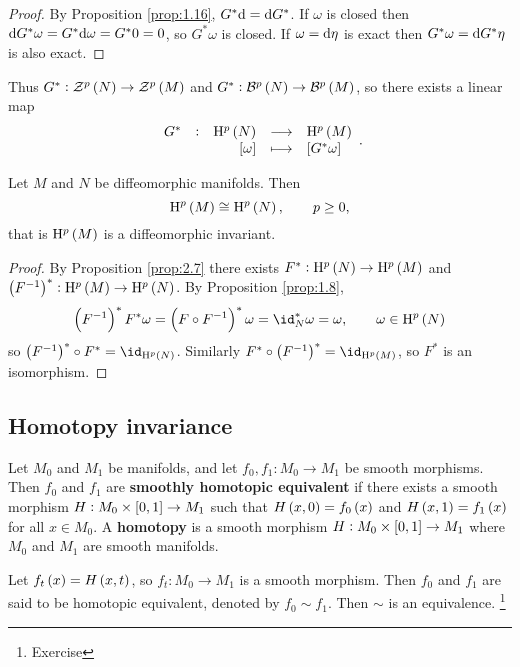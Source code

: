 \begin{proof}
By Proposition \ref{prop:1.16}, $ G^*\mathrm{d} = \mathrm{d} G^* $. If $ \omega $ is closed then $ \mathrm{d} G^*\omega = G^*\mathrm{d}\omega = G^*0 = 0 $, so $ G^*\omega $ is closed. If $ \omega = \mathrm{d}\eta $ is exact then $ G^*\omega = \mathrm{d} G^*\eta $ is also exact.
\end{proof}

Thus $ G^* : \ZZZ^p\br{N} \to \ZZZ^p\br{M} $ and $ G^* : \BBB^p\br{N} \to \BBB^p\br{M} $, so there exists a linear map
$$ \function[G^*]{\H^p\br{N}}{\H^p\br{M}}{\sbr{\omega}}{\sbr{G^*\omega}}. $$

\begin{corollary}
Let $ M $ and $ N $ be diffeomorphic manifolds. Then
$$ \H^p\br{M} \cong \H^p\br{N}, \qquad p \ge 0, $$
that is $ \H^p\br{M} $ is a diffeomorphic invariant.
\end{corollary}

\begin{proof}
By Proposition \ref{prop:2.7} there exists $ F^* : \H^p\br{N} \to \H^p\br{M} $ and $ \br{F^{-1}}^* : \H^p\br{M} \to \H^p\br{N} $. By Proposition \ref{prop:1.8},
$$ \br{F^{-1}}^*F^*\omega = \br{F \circ F^{-1}}^*\omega = \id_N^*\omega = \omega, \qquad \omega \in \H^p\br{N} $$
so $ \br{F^{-1}}^* \circ F^* = \id_{\H^p\br{N}} $. Similarly $ F^* \circ \br{F^{-1}}^* = \id_{\H^p\br{M}} $, so $ F^* $ is an isomorphism.
\end{proof}

\subsection{Homotopy invariance}

\begin{definition}
Let $ M_0 $ and $ M_1 $ be manifolds, and let $ f_0, f_1 : M_0 \to M_1 $ be smooth morphisms. Then $ f_0 $ and $ f_1 $ are \textbf{smoothly homotopic equivalent} if there exists a smooth morphism $ H : M_0 \times \sbr{0, 1} \to M_1 $ such that $ H\br{x, 0} = f_0\br{x} $ and $ H\br{x, 1} = f_1\br{x} $ for all $ x \in M_0 $. A \textbf{homotopy} is a smooth morphism $ H : M_0 \times \sbr{0, 1} \to M_1 $ where $ M_0 $ and $ M_1 $ are smooth manifolds.
\end{definition}


\begin{notation}
Let $ f_t\br{x} = H\br{x, t} $, so $ f_t : M_0 \to M_1 $ is a smooth morphism. Then $ f_0 $ and $ f_1 $ are said to be homotopic equivalent, denoted by $ f_0 \sim f_1 $. Then $ \sim $ is an equivalence. \footnote{Exercise}
\end{notation}

